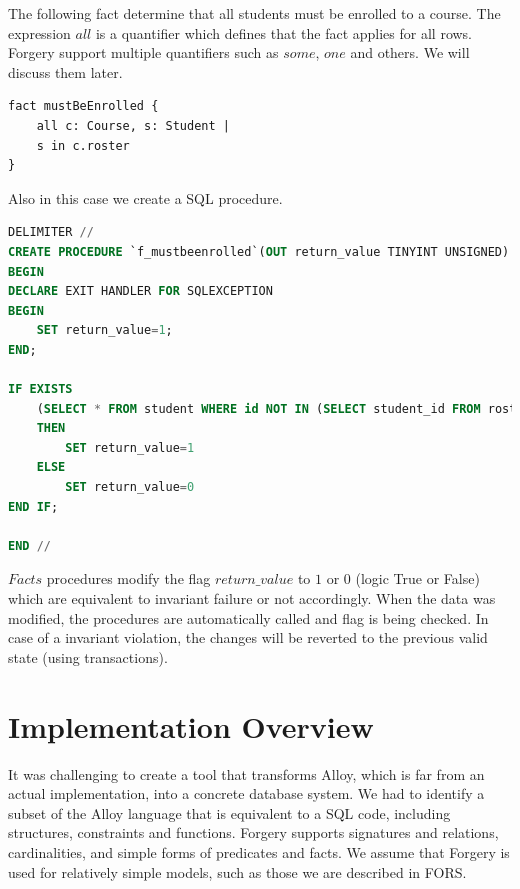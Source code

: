 \documentclass[oneside]{book}
\begin{document}
The following fact determine that all students must be enrolled to a course. The expression $all$ is a quantifier which defines that the fact applies for all rows. Forgery support multiple quantifiers such as $some$, $one$ and others. We will discuss them later.

\begin{lstlisting}
fact mustBeEnrolled {
	all c: Course, s: Student | 
	s in c.roster
}
\end{lstlisting}

Also in this case we create a SQL procedure.

\begin{lstlisting}[escapechar=@,language=SQL]
DELIMITER //
CREATE PROCEDURE `f_mustbeenrolled`(OUT return_value TINYINT UNSIGNED)
BEGIN
DECLARE EXIT HANDLER FOR SQLEXCEPTION
BEGIN
	SET return_value=1;
END;

IF EXISTS
	(SELECT * FROM student WHERE id NOT IN (SELECT student_id FROM roster))
	THEN
		SET return_value=1
	ELSE
		SET return_value=0
END IF;
	
END //
\end{lstlisting}

$Facts$ procedures modify the flag $return\_value$ to $1$ or $0$ (logic True or False) which are equivalent to invariant failure or not accordingly. When the data was modified, the procedures are automatically called and flag is being checked. In case of a invariant violation, the changes will be reverted to the previous valid state (using transactions).\\

\newpage

\section{Implementation Overview}
It was challenging to create a tool that transforms Alloy, which is far from an actual implementation, into a concrete database system. We had to identify a subset of the Alloy language that is equivalent to a SQL code, including structures, constraints and functions. Forgery supports signatures and relations, cardinalities, and simple forms of predicates and facts. We assume that Forgery is used for relatively simple models, such as those we are described in FORS.
\end{document}
